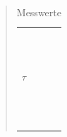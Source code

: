 \begin{quote}
\begin{table}[h]
\begin{addmargin}[-1cm]{3cm}
\begin{tabular}{|p{3cm}|p{3cm}|p{10.2cm}|}
                                 & & \\
                                 & & \\
                                 & & \\
                                 & & \\
                                 & & \\
                                 & & \\
                                 & & \\
                                 & & \\
                                 & & \\
                                 & & \\
                                 & & \\
         \hline
         $\tau$ & &\\
                                 & & \\
                                 & & \\
                                 & & \\
                                 & & \\
                                 & & \\
                                 & & \\
                                 & & \\
                                 & & \\
                                 & & \\
                                 & & \\
                                 & & \\
                                 & & \\
         \hline

                           \end{tabular}
                    \end{addmargin}
             \caption{Messwerte}
         \label{Messwerte2}
      \end{table}

      \vspace{2em}


\end{quote}
